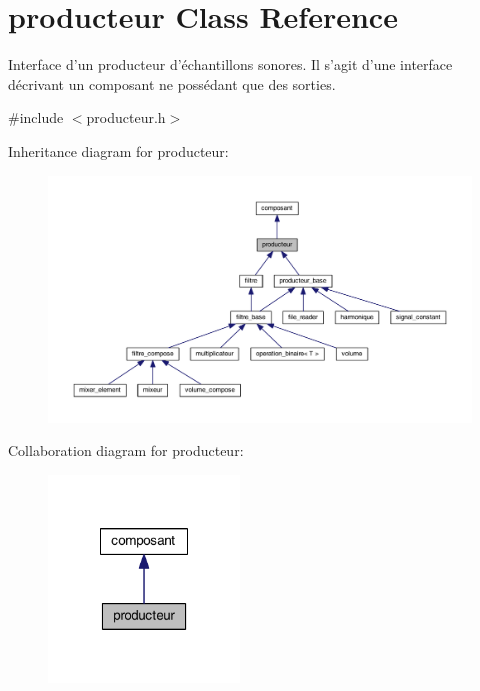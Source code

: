 \hypertarget{classproducteur}{\section{producteur Class Reference}
\label{classproducteur}
}


Interface d'un producteur d'échantillons sonores. Il s'agit d'une interface décrivant un composant ne possédant que des sorties.  




{\ttfamily \#include $<$producteur.\-h$>$}



Inheritance diagram for producteur\-:
\nopagebreak
\begin{figure}[H]
\begin{center}
\leavevmode
\includegraphics[width=350pt]{classproducteur__inherit__graph}
\end{center}
\end{figure}


Collaboration diagram for producteur\-:
\nopagebreak
\begin{figure}[H]
\begin{center}
\leavevmode
\includegraphics[width=144pt]{classproducteur__coll__graph}
\end{center}
\end{figure}
